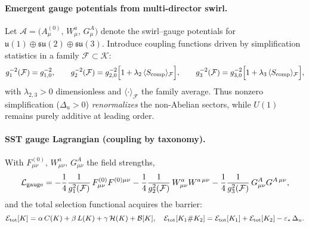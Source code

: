 \documentclass[11pt]{article}
\begin{document}
        \paragraph{Emergent gauge potentials from multi-director swirl.}
            Let \(\mathcal A=\big(A_\mu^{(0)},\,W_\mu^a,\,G_\mu^A\big)\) denote the swirl–gauge potentials for
            \(\mathfrak u(1)\oplus\mathfrak{su}(2)\oplus\mathfrak{su}(3)\).
            Introduce coupling functions driven by simplification statistics in a family \(\mathcal F\subset\mathcal K\):
            \[
                g_1^{-2}(\mathcal F)=g_{1,0}^{-2},\qquad
                g_2^{-2}(\mathcal F)=g_{2,0}^{-2}\Bigl[1+\lambda_2\,\langle S_{\rm comp}\rangle_{\mathcal F}\Bigr],
                \qquad
                g_3^{-2}(\mathcal F)=g_{3,0}^{-2}\Bigl[1+\lambda_3\,\langle S_{\rm comp}\rangle_{\mathcal F}\Bigr],
            \]
            with \(\lambda_{2,3}>0\) dimensionless and \(\langle\cdot\rangle_{\mathcal F}\) the family average.
            Thus nonzero simplification (\(\Delta_u>0\)) \emph{renormalizes} the non-Abelian sectors, while \(U(1)\) remains purely additive at leading order.

        \paragraph{SST gauge Lagrangian (coupling by taxonomy).}
            With \(F_{\mu\nu}^{(0)},\,W_{\mu\nu}^a,\,G_{\mu\nu}^A\) the field strengths,
            \[
                \mathcal L_{\rm gauge}
                =-\frac{1}{4}\frac{1}{g_1^2(\mathcal F)}\,F_{\mu\nu}^{(0)}F^{(0)\mu\nu}
                -\frac{1}{4}\frac{1}{g_2^2(\mathcal F)}\,W_{\mu\nu}^{a}W^{a\,\mu\nu}
                -\frac{1}{4}\frac{1}{g_3^2(\mathcal F)}\,G_{\mu\nu}^{A}G^{A\,\mu\nu},
            \]
            and the total selection functional acquires the barrier:
            \[
                \mathcal E_{\rm tot}[K]=\alpha\,C(K)+\beta\,L(K)+\gamma\,\mathcal H(K)+\mathcal B[K],
                \quad
                \mathcal E_{\rm tot}[K_1\#K_2]
                =\mathcal E_{\rm tot}[K_1]+\mathcal E_{\rm tot}[K_2]-\varepsilon_*\,\Delta_u.
            \]
\end{document}
